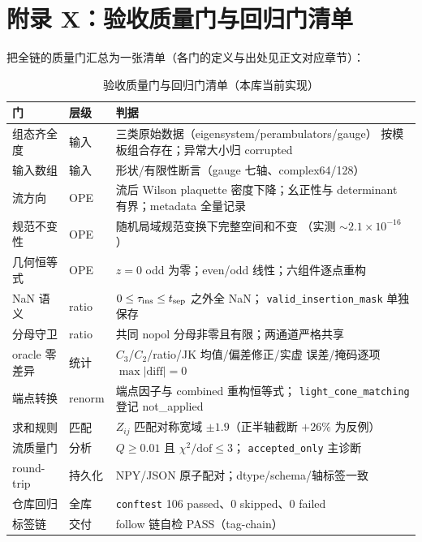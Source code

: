 \documentclass[11pt,a4paper]{ctexart}
\newcommand{\code}[1]{\texttt{#1}}
\begin{document}
\section{附录 X：验收质量门与回归门清单}

把全链的质量门汇总为一张清单（各门的定义与出处见正文对应章节）：

\begin{table}[htbp]
\centering
\caption{验收质量门与回归门清单（本库当前实现）}
\footnotesize
\begin{tabularx}{\textwidth}{@{}l l >{\raggedright\arraybackslash}X@{}}
\toprule
\textbf{门} & \textbf{层级} & \textbf{判据} \\
\midrule
组态齐全度 & 输入 & 三类原始数据（eigensystem/perambulators/gauge）
按模板组合存在；异常大小归 corrupted \\
输入数组 & 输入 & 形状/有限性断言（gauge 七轴、complex64/128） \\
流方向 & OPE & 流后 Wilson plaquette 密度下降；幺正性与 determinant
有界；metadata 全量记录 \\
规范不变性 & OPE & 随机局域规范变换下完整空间和不变
（实测 $\sim2.1\times10^{-16}$） \\
几何恒等式 & OPE & $z=0$ odd 为零；even/odd 线性；六组件逐点重构 \\
NaN 语义 & ratio & $0\le\tau_{\rm ins}\le t_{\rm sep}$ 之外全 NaN；
\code{valid\_insertion\_mask} 单独保存 \\
分母守卫 & ratio & 共同 nopol 分母非零且有限；两通道严格共享 \\
oracle 零差异 & 统计 & $C_3$/$C_2$/ratio/JK 均值/偏差修正/实虚
误差/掩码逐项 $\max|\mathrm{diff}|=0$ \\
端点转换 & renorm & 端点因子与 combined 重构恒等式；
\code{light\_cone\_matching} 登记 not\_applied \\
求和规则 & 匹配 & $Z_{ij}$ 匹配对称宽域 $\pm1.9$（正半轴截断
$+26\%$ 为反例） \\
流质量门 & 分析 & $Q\ge0.01$ 且 $\chi^2/\mathrm{dof}\le3$；
\code{accepted\_only} 主诊断 \\
round-trip & 持久化 & NPY/JSON 原子配对；dtype/schema/轴标签一致 \\
仓库回归 & 全库 & \code{conftest} 106 passed、0 skipped、0 failed \\
标签链 & 交付 & follow 链自检 PASS（tag-chain） \\
\bottomrule
\end{tabularx}
\end{table}
\end{document}
